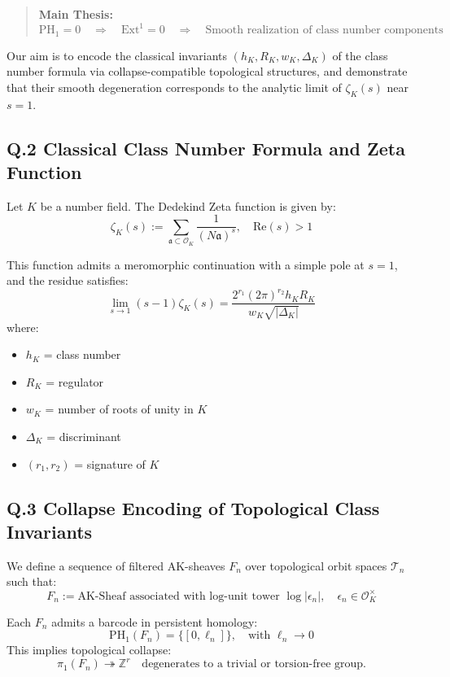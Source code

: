 \documentclass[11pt]{article}
\begin{document}
\begin{axiom}
\begin{axiom}
{{\begin{quote}
\textbf{Main Thesis:}  
\[
\mathrm{PH}_1 = 0 \quad \Rightarrow \quad \mathrm{Ext}^1 = 0 \quad \Rightarrow \quad \text{Smooth realization of class number components}
\]
\end{quote}

Our aim is to encode the classical invariants $(h_K, R_K, w_K, \Delta_K)$ of the class number formula via collapse-compatible topological structures, and demonstrate that their smooth degeneration corresponds to the analytic limit of $\zeta_K(s)$ near $s = 1$.

\subsection*{Q.2 Classical Class Number Formula and Zeta Function}

Let $K$ be a number field. The Dedekind Zeta function is given by:
\[
\zeta_K(s) := \sum_{\mathfrak{a} \subset \mathcal{O}_K} \frac{1}{(N\mathfrak{a})^s}, \quad \mathrm{Re}(s) > 1
\]

This function admits a meromorphic continuation with a simple pole at $s = 1$, and the residue satisfies:
\[
\lim_{s \to 1} (s - 1) \zeta_K(s) = \frac{2^{r_1} (2\pi)^{r_2} h_K R_K}{w_K \sqrt{|\Delta_K|}}
\]
where:
\begin{itemize}
  \item $h_K$ = class number  
  \item $R_K$ = regulator  
  \item $w_K$ = number of roots of unity in $K$  
  \item $\Delta_K$ = discriminant  
  \item $(r_1, r_2)$ = signature of $K$
\end{itemize}

\subsection*{Q.3 Collapse Encoding of Topological Class Invariants}

We define a sequence of filtered AK-sheaves $F_n$ over topological orbit spaces $\mathcal{T}_n$ such that:
\[
F_n := \text{AK-Sheaf associated with log-unit tower } \log |\epsilon_n|, \quad \epsilon_n \in \mathcal{O}_K^\times
\]

Each $F_n$ admits a barcode in persistent homology:
\[
\mathrm{PH}_1(F_n) = \{ [0, \ell_n] \}, \quad \text{with } \ell_n \to 0
\]
This implies topological collapse: 
\[
\pi_1(F_n) \twoheadrightarrow \mathbb{Z}^{r} \quad \text{degenerates to a trivial or torsion-free group.}
\]

}}
\end{axiom}
\end{axiom}
\end{document}

